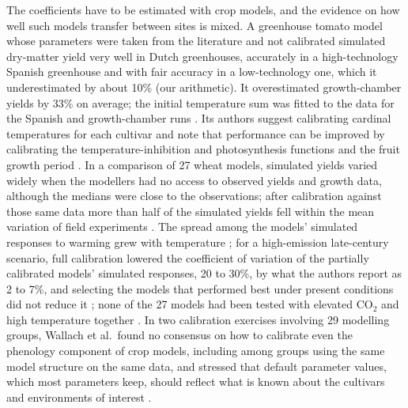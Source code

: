 The coefficients have to be estimated with crop models, and the evidence on how well such models transfer between sites is mixed. A greenhouse tomato model whose parameters were taken from the literature and not calibrated simulated dry-matter yield very well in Dutch greenhouses, accurately in a high-technology Spanish greenhouse and with fair accuracy in a low-technology one, which it underestimated by about 10\% (our arithmetic). It overestimated growth-chamber yields by 33\% on average; the initial temperature sum was fitted to the data for the Spanish and growth-chamber runs \cite[Section~4, p.~387; Sections~5.1--5.3, pp.~390--391]{vanthoor2011tomato}. Its authors suggest calibrating cardinal temperatures for each cultivar and note that performance can be improved by calibrating the temperature-inhibition and photosynthesis functions and the fruit growth period \cite[Section~5.2, p.~390; Section~5.5, p.~393]{vanthoor2011tomato}. In a comparison of 27 wheat models, simulated yields varied widely when the modellers had no access to observed yields and growth data, although the medians were close to the observations; after calibration against those same data more than half of the simulated yields fell within the mean variation of field experiments \cite[p.~827; Fig.~1, p.~828]{asseng2013uncertainty}. The spread among the models' simulated responses to warming grew with temperature \cite[p.~829]{asseng2013uncertainty}; for a high-emission late-century scenario, full calibration lowered the coefficient of variation of the partially calibrated models' simulated responses, 20 to 30\%, by what the authors report as 2 to 7\%, and selecting the models that performed best under present conditions did not reduce it \cite[pp.~827, 829]{asseng2013uncertainty}; none of the 27 models had been tested with elevated CO$_2$ and high temperature together \cite[p.~829]{asseng2013uncertainty}. In two calibration exercises involving 29 modelling groups, Wallach et al.\ found no consensus on how to calibrate even the phenology component of crop models, including among groups using the same model structure on the same data, and stressed that default parameter values, which most parameters keep, should reflect what is known about the cultivars and environments of interest \cite[Section~2, p.~3; Section~4, p.~7; Section~4.2, p.~8]{wallach2021chaos}.

